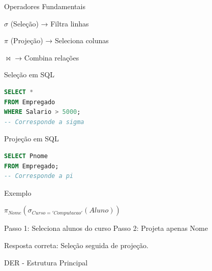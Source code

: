\documentclass{beamer}
\begin{document}
\begin{frame}{Operadores Fundamentais}

$\sigma$ (Seleção) → Filtra linhas  

$\pi$ (Projeção) → Seleciona colunas  

$\Join$ → Combina relações  

\end{frame}

\begin{frame}[fragile]{Seleção em SQL}

\begin{lstlisting}[language=SQL]
SELECT *
FROM Empregado
WHERE Salario > 5000;
-- Corresponde a sigma
\end{lstlisting}

\end{frame}

\begin{frame}[fragile]{Projeção em SQL}

\begin{lstlisting}[language=SQL]
SELECT Pnome
FROM Empregado;
-- Corresponde a pi
\end{lstlisting}

\end{frame}

\begin{frame}{Exemplo}

$\pi_{Nome}(\sigma_{Curso='Computacao'}(Aluno))$

Passo 1: Seleciona alunos do curso  
Passo 2: Projeta apenas Nome  

Resposta correta: Seleção seguida de projeção.
\end{frame}

\begin{frame}{DER - Estrutura Principal}
\centering
{}
\end{frame}
\end{document}

